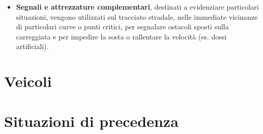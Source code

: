 \begin{itemize}
\item \textbf{Segnali e attrezzature complementari}, destinati a evidenziare particolari situazioni, vengono utilizzati sul tracciato stradale, nelle immediate vicinanze di particolari curve o punti critici, per segnalare ostacoli sposti sulla carreggiata e per impedire la sosta o rallentare la velocità (es. dossi artificiali).
\end{itemize}

\section{Veicoli}

\section{Situazioni di precedenza}

